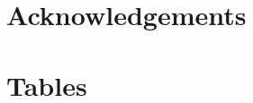 \documentclass[12pt]{SCreport}
\begin{document}
\section*{Acknowledgements}





\appendix

\section{Tables}
\end{document}
